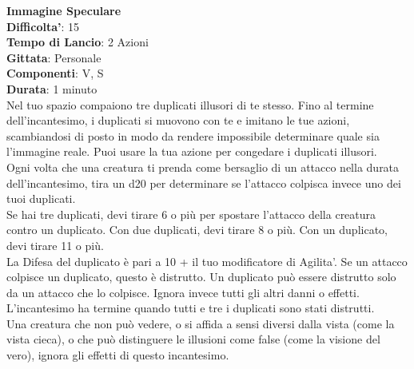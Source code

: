 \begin{multicols}{2}
\medskip\textbf{Immagine Speculare}\\
\textbf{Difficolta'}: 15\\
\textbf{Tempo di Lancio}: 2 Azioni\\
\textbf{Gittata}: Personale\\
\textbf{Componenti}: V, S\\
\textbf{Durata}: 1 minuto\\
Nel tuo spazio compaiono tre duplicati illusori di te stesso. Fino al termine dell’incantesimo, i duplicati si muovono con te e imitano le tue azioni, scambiandosi di posto in modo da rendere impossibile determinare quale sia l’immagine reale. Puoi usare la tua azione per congedare i duplicati illusori.\\
Ogni volta che una creatura ti prenda come bersaglio di un attacco nella durata dell’incantesimo, tira un d20 per determinare se l’attacco colpisca invece uno dei tuoi duplicati.\\
Se hai tre duplicati, devi tirare 6 o più per spostare l’attacco della creatura contro un duplicato. Con due duplicati, devi tirare 8 o più. Con un duplicato, devi tirare 11 o più.\\
La Difesa del duplicato è pari a 10 + il tuo modificatore di Agilita'. Se un attacco colpisce un duplicato, questo è distrutto. Un duplicato può essere distrutto solo da un attacco che lo colpisce. Ignora invece tutti gli altri danni o effetti. L’incantesimo ha termine quando tutti e tre i duplicati sono stati distrutti.\\
Una creatura che non può vedere, o si affida a sensi diversi dalla vista (come la vista cieca), o che può  distinguere le illusioni come false (come la visione del vero), ignora gli effetti di questo incantesimo. 


\end{multicols}
